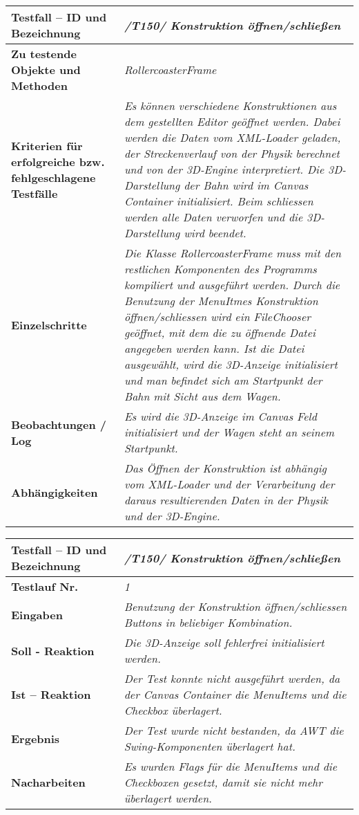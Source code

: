 \begin{longtable}{|p{7cm}|p{10cm}|}
\hline
\textbf{Testfall -- ID und Bezeichnung} &  \textit{/T150/ Konstruktion öffnen/schließen } \\
\hline
\textbf{Zu testende Objekte und Methoden} &  \textit{RollercoasterFrame}
\\
\hline
\textbf{Kriterien für erfolgreiche bzw. fehlgeschlagene Testfälle} &
\textit{Es können verschiedene Konstruktionen aus dem gestellten Editor geöffnet werden. Dabei werden die Daten vom XML-Loader geladen, der Streckenverlauf von der Physik berechnet
 und von der 3D-Engine interpretiert. Die 3D-Darstellung der Bahn wird im Canvas Container initialisiert. Beim schliessen werden alle Daten verworfen und die 3D-Darstellung wird beendet.} \\
\hline
\textbf{Einzelschritte} &  \textit{Die Klasse RollercoasterFrame muss mit den restlichen Komponenten des Programms kompiliert und ausgeführt werden. Durch die Benutzung der MenuItmes
Konstruktion öffnen/schliessen wird ein FileChooser geöffnet, mit dem die zu öffnende Datei angegeben werden kann. Ist die Datei ausgewählt, wird die 3D-Anzeige initialisiert und man befindet
sich am Startpunkt der Bahn mit Sicht aus dem Wagen.} \\
\hline
\textbf{Beobachtungen / Log} &  \textit{Es wird die 3D-Anzeige im Canvas Feld initialisiert und der Wagen steht an seinem Startpunkt.} \\
\hline
\textbf{Abhängigkeiten} &  \textit{Das Öffnen der Konstruktion ist abhängig vom XML-Loader und der Verarbeitung der daraus resultierenden Daten in der Physik und der 3D-Engine.} \\
\hline
 \end{longtable}


\begin{longtable}{|p{7cm}|p{10cm}|}
\hline
\textbf{Testfall -- ID und Bezeichnung} & \textit{/T150/ Konstruktion öffnen/schließen} \\
\hline
\textbf{Testlauf Nr.} & \textit{1} \\
\hline
\textbf{Eingaben} & \textit{Benutzung der Konstruktion öffnen/schliessen Buttons in beliebiger Kombination.} \\
\hline
\textbf{Soll - Reaktion} & \textit{ Die 3D-Anzeige soll fehlerfrei initialisiert werden.} \\
\hline
\textbf{Ist -- Reaktion} & \textit{ Der Test konnte nicht ausgeführt werden, da der Canvas Container die MenuItems und die Checkbox überlagert.} \\
\hline
\textbf{Ergebnis} & \textit{Der Test wurde nicht bestanden, da AWT die Swing-Komponenten überlagert hat.} \\
\hline
\textbf{Nacharbeiten } & \textit{Es wurden Flags für die MenuItems und die Checkboxen gesetzt, damit sie nicht mehr überlagert werden.} \\
\hline
 \end{longtable}

